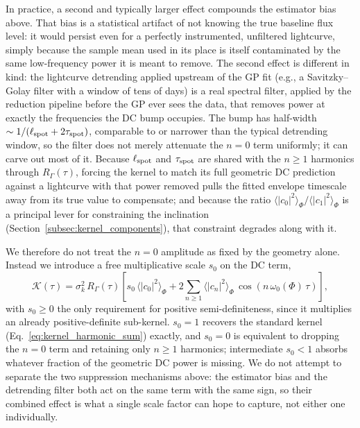 \documentclass[preprint]{aastex702}
\begin{document}
In practice, a second and typically larger effect compounds the estimator bias above. That bias is a statistical artifact of not knowing the true baseline flux level: it would persist even for a perfectly instrumented, unfiltered lightcurve, simply because the sample mean used in its place is itself contaminated by the same low-frequency power it is meant to remove. The second effect is different in kind: the lightcurve detrending applied upstream of the GP fit (e.g., a Savitzky--Golay filter with a window of tens of days) is a real spectral filter, applied by the reduction pipeline before the GP ever sees the data, that removes power at exactly the frequencies the DC bump occupies. The bump has half-width $\sim 1/(\ell_{\rm spot} + 2\tau_{\rm spot})$, comparable to or narrower than the typical detrending window, so the filter does not merely attenuate the $n = 0$ term uniformly; it can carve out most of it. Because $\ell_{\rm spot}$ and $\tau_{\rm spot}$ are shared with the $n \geq 1$ harmonics through $R_\Gamma(\tau)$, forcing the kernel to match its full geometric DC prediction against a lightcurve with that power removed pulls the fitted envelope timescale away from its true value to compensate; and because the ratio $\langle|c_0|^2\rangle_\Phi/\langle|c_1|^2\rangle_\Phi$ is a principal lever for constraining the inclination (Section~\ref{subsec:kernel_components}), that constraint degrades along with it.

We therefore do not treat the $n = 0$ amplitude as fixed by the geometry alone. Instead we introduce a free multiplicative scale $s_0$ on the DC term,
\begin{equation}
    \mathcal{K}(\tau) = \sigma_k^2\, R_\Gamma(\tau) \left[ s_0\, \langle|c_0|^2\rangle_\Phi + 2\sum_{n \geq 1} \langle|c_n|^2\rangle_\Phi\, \cos(n\,\omega_0(\Phi)\,\tau) \right],
    \label{eq:kernel_s0}
\end{equation}
with $s_0 \geq 0$ the only requirement for positive semi-definiteness, since it multiplies an already positive-definite sub-kernel. $s_0 = 1$ recovers the standard kernel (Eq.~\ref{eq:kernel_harmonic_sum}) exactly, and $s_0 = 0$ is equivalent to dropping the $n = 0$ term and retaining only $n \geq 1$ harmonics; intermediate $s_0 < 1$ absorbs whatever fraction of the geometric DC power is missing. We do not attempt to separate the two suppression mechanisms above: the estimator bias and the detrending filter both act on the same term with the same sign, so their combined effect is what a single scale factor can hope to capture, not either one individually.
\end{document}
